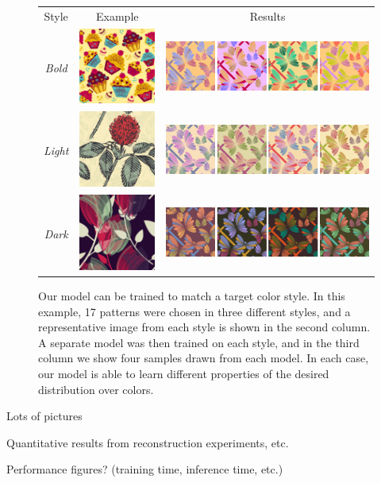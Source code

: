 \begin{figure}[ht]
\begin{tabular}{ccc} 
Style&Example&Results\\ %
\emph{Bold}&\includegraphics[width=.145\columnwidth]{figs/styleResultsBoldExample}&\includegraphics[width=.6\columnwidth]{figs/styleResultsBold}\vspace{0.5em}\\
\emph{Light}&\includegraphics[width=.145\columnwidth]{figs/styleResultsLightExample}&\includegraphics[width=.6\columnwidth]{figs/styleResultsLight}\vspace{0.5em}\\
\emph{Dark}&\includegraphics[width=.145\columnwidth]{figs/styleResultsDarkExample}&\includegraphics[width=.6\columnwidth]{figs/styleResultsDark}\vspace{0.5em}\\
\end{tabular}

\caption{Our model can be trained to match a target color style. In this example, 17 patterns were chosen in three different styles, and a representative image from each style is shown in the second column. A separate model was then trained on each style, and in the third column we show four samples drawn from each model. In each case, our model is able to learn different properties of the desired distribution over colors.}
\label{fig:styleTraining}
\vspace{-1.0em}
\end{figure}

Lots of pictures

Quantitative results from reconstruction experiments, etc.

Performance figures? (training time, inference time, etc.)